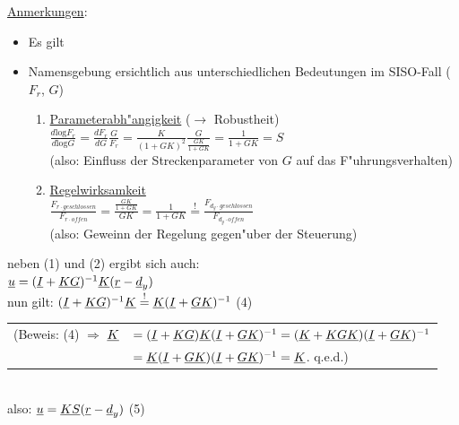\documentclass[openany,a4paper,11pt]{book}
\begin{document}
\uline{Anmerkungen}:\begin{itemize}
    \item Es gilt 
    \item Namensgebung ersichtlich aus unterschiedlichen Bedeutungen im SISO-Fall ($F_r$, $G$) \begin{enumerate}
        \item \uline{Parameterabh"angigkeit} ($\rightarrow$ Robustheit)\\[5pt]
        $\displaystyle\frac{d \text{log} F_r}{d\text{log}G}=\frac{dF_r}{dG}\frac{G}{F_r}=\frac{K}{(1+GK)^2}\frac{G}{\frac{GK}{1+GK}}=\frac{1}{1+GK}=S$\\
        (also: Einfluss der Streckenparameter von $G$ auf das F"uhrungsverhalten)
        \item \uline{Regelwirksamkeit}\\
        $\displaystyle\frac{F_{r\cdot geschlossen}}{F_{r\cdot offen}}=\frac{\frac{GK}{1+GK}}{GK}=\frac{1}{1+GK}\stackrel{!}{=}\frac{F_{d_y\cdot geschlossen}}{F_{d_y\cdot offen}}$\\
        (also: Geweinn der Regelung gegen"uber der Steuerung)
    \end{enumerate}
\end{itemize}
neben (1) und (2) ergibt sich auch:\\
$\uline{u}=(\uline{I}+\uline{KG})^{-1}\uline{K}(\uline{r}-\uline{d}_y)$\\
nun gilt: $(\uline{I}+\uline{KG})^{-1}\uline{K}\stackrel{!}{=}\uline{K}(\uline{I}+\uline{GK})^{-1}$ \quad (4)\\
\begin{tabular}{ll}
    (Beweis: (4) $\Rightarrow$ $\uline{K}$ & $=(\uline{I}+\uline{KG})\uline{K}(\uline{I}+\uline{GK})^{-1}=(\uline{K}+\uline{KGK})(\uline{I}+\uline{GK})^{-1}$\\
    & $=\uline{K}(\uline{I}+\uline{GK})(\uline{I}+\uline{GK})^{-1}=\uline{K}$. q.e.d.)
\end{tabular}\\
also: $\uline{u}=\uline{KS}(\uline{r}-\uline{d}_y)$ \quad (5)\\
\end{document}
